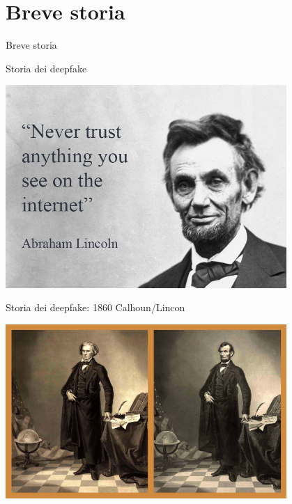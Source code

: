 \documentclass[11pt]{beamer}
\begin{document}
\section{Breve storia}

\begin{frame}
\begin{center}
\Huge
Breve storia
\end{center}
\end{frame}

\begin{frame}{Storia dei deepfake }

\begin{center}
\includegraphics[width=0.8\textwidth]{Pic/lincon.jpg}
\end{center}

\end{frame}


\begin{frame}{Storia dei deepfake: 1860 Calhoun/Lincon \cite{ng}}

\begin{center}
\includegraphics[width=0.8\textwidth]{Pic/Licon_deepfake.jpg}
\end{center}

\end{frame}
\end{document}
